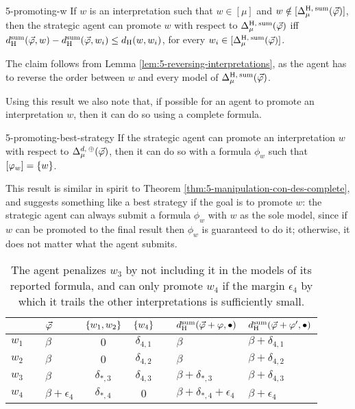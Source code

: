\begin{prp}{}{5-promoting-w}
	If $w$ is an interpretation such that $w\in[\mu]$ and $w\notin\mods{\me^{\hamming,\:\ssum}_{\mu}(\P)}$,
	then the strategic agent can promote $w$ with respect to $\me^{\hamming,\:\ssum}_{\mu}(\P)$ iff
	$\dd_\hamming^\ssum(\P,w)-\dd_\hamming^\ssum(\P,w_i)\le \dd_\hamming(w,w_i)$, 
	for every $w_i\in\mods{\me^{\hamming,\:\ssum}_{\mu}(\P)}$.
\end{prp}
\begin{prf*}{}{}%
	The claim follows from Lemma \ref{lem:5-reversing-interpretations}, 
	as the agent has to reverse the order between $w$
	and every model of $\me^{\hamming,\:\ssum}_{\mu}(\P)$.
\end{prf*}

Using this result we also note that, if possible for an agent to promote an interpretation $w$, then 
it can do so using a complete formula.

\begin{crl}{}{5-promoting-best-strategy}
	If the strategic agent can promote an interpretation $w$ with respect to $\me_\mu^{\dd,\:\agg}(\P)$,
	then it can do so with a formula $\phi_w$ such that $\mods{\phi_w}=\set{w}$.
\end{crl}
 
This result is similar in spirit to Theorem \ref{thm:5-manipulation-con-des-complete}, 
and suggests something like a 
best strategy if the goal is to promote $w$: 
the strategic agent can always submit a formula $\phi_w$ with $w$ as the sole model,
since if $w$ can be promoted to the final result then $\phi_w$ 
is guaranteed to do it; otherwise, it does not matter what the agent submits.

\begin{table}
	\centering
	\begin{tabular}{cclcccll}
		\toprule
		& \quad\quad&$\P$ & $\set{w_1,w_2}$ & $\set{w_4}$ &\quad\quad\quad& $\dd_\hamming^\ssum(\P+\phi,\bullet)$ & $\dd_\hamming^\ssum(\P+\phi',\bullet)$\\\midrule
		$w_1$ && $\beta$ & $0$ & $\delta_{4,1}$ && $\beta$ & $\beta+\delta_{4,1}$\\
		$w_2$ && $\beta$ & $0$ & $\delta_{4,2}$ && $\beta$ & $\beta+\delta_{4,2}$\\
		$w_3$ && $\beta$ & $\delta_{\ast,3}$ & $\delta_{4,3}$ && $\beta+\delta_{\ast,3}$ & $\beta+\delta_{4,3}$\\
		$w_4$ && $\beta+\epsilon_4$ & $\delta_{\ast,4}$ & $0$ && $\beta+\delta_{\ast,4}+\epsilon_4$& $\beta+\epsilon_4$\\
		\bottomrule
	\end{tabular}
	\caption{
		The agent penalizes $w_3$ by not including it in the models of its reported formula,
		and can only promote $w_4$ if the margin $\epsilon_4$ by which it trails the other interpretations
		is sufficiently small.
		}
	\label{tab:5-kicking-out-a-model-hamming-sum}
\end{table}

